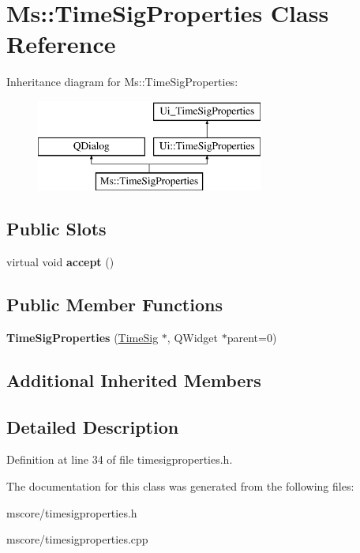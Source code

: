 \hypertarget{class_ms_1_1_time_sig_properties}{}\section{Ms\+:\+:Time\+Sig\+Properties Class Reference}
\label{class_ms_1_1_time_sig_properties}
Inheritance diagram for Ms\+:\+:Time\+Sig\+Properties\+:\begin{figure}[H]
\begin{center}
\leavevmode
\includegraphics[height=3.000000cm]{class_ms_1_1_time_sig_properties}
\end{center}
\end{figure}
\subsection*{Public Slots}
\begin{DoxyCompactItemize}
\item 
\mbox{\label{class_ms_1_1_time_sig_properties_a390c256d9ae92c4991c85572de4432fa}} 
virtual void {\bfseries accept} ()
\end{DoxyCompactItemize}
\subsection*{Public Member Functions}
\begin{DoxyCompactItemize}
\item 
\mbox{\label{class_ms_1_1_time_sig_properties_ab7cd84e27f5135604c50a95d2342385b}} 
{\bfseries Time\+Sig\+Properties} (\hyperlink{class_ms_1_1_time_sig}{Time\+Sig} $\ast$, Q\+Widget $\ast$parent=0)
\end{DoxyCompactItemize}
\subsection*{Additional Inherited Members}


\subsection{Detailed Description}


Definition at line 34 of file timesigproperties.\+h.



The documentation for this class was generated from the following files\+:\begin{DoxyCompactItemize}
\item 
mscore/timesigproperties.\+h\item 
mscore/timesigproperties.\+cpp\end{DoxyCompactItemize}
